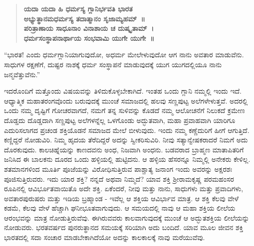 \begin{verse}
\textbf{ಯದಾ ಯದಾ ಹಿ ಧರ್ಮಸ್ಯ ಗ್ಲಾನಿರ್ಭವತಿ ಭಾರತ}\\\textbf{ಅಭ್ಯುತ್ಥಾನಮಧರ್ಮಸ್ಯ ತದಾತ್ಮಾನಂ ಸೃಜಾಮ್ಯಹಮ್​~॥}\\\textbf{ಪರಿತ್ರಾಣಾಯ ಸಾಧೂನಾಂ ವಿನಾಶಾಯ ಚ ದುಷ್ಕೃತಾಮ್​~।}\\\textbf{ಧರ್ಮಸಂಸ್ಥಾಪನಾರ್ಥಾಯ ಸಂಭವಾಮಿ ಯುಗೇ ಯುಗೇ~॥}
\end{verse}

“ಭಾರತ! ಎಂದು ಧರ್ಮಗ್ಲಾನಿಯಾಗುವುದೋ, ಅಧರ್ಮ ಮೇಲೇಳುವುದೋ ಆಗ ನಾನು ಅವತಾರ ಮಾಡುವೆನು. ಸಾಧುಗಳ ರಕ್ಷಣೆಗೆ, ದುಷ್ಟರ ನಾಶಕ್ಕೆ ಧರ್ಮ ಸಂಸ್ಥಾಪನೆ ಮಾಡುವುದಕ್ಕೆ ಯುಗ ಯುಗದಲ್ಲಿಯೂ ನಾನು ಜನ್ಮವೆತ್ತುವೆನು.”

ಇದರೊಂದಿಗೆ ಮತ್ತೊಂದು ವಿಷಯವನ್ನು ತಿಳಿದುಕೊಳ್ಳಬೇಕಾಗಿದೆ. ಇಂತಹ ಒಂದು ಗ್ಲಾನಿ ನಮ್ಮಲ್ಲಿ ಇಂದು ಇದೆ. ಆಧ್ಯಾತ್ಮಿಕ ಮಹಾತರಂಗವೊಂದು ಬರುವುದಕ್ಕೆ ಮುಂಚೆ ಸಮಾಜದಲ್ಲಿ ಹಲವು ಸಣ್ಣಪುಟ್ಟ ಅಲೆಗಳೇಳುತ್ತವೆ. ಅದರಲ್ಲಿ ಒಂದು ನಮ್ಮ ದೃಷ್ಟಿಗೆ ಗೋಚರವಾಗದೆ, ನಮಗೆ ತನ್ನ ಸುಳಿವನ್ನು ಕೊಡದೆ ನಮ್ಮ ಆಲೋಚನೆಗೆ ನಿಲುಕದೆ ಕ್ರಮೇಣ ದೊಡ್ಡದು ದೊಡ್ಡದಾಗಿ ಸಣ್ಣಪುಟ್ಟ ಅಲೆಗಳನ್ನೆಲ್ಲ ಒಳಗೊಂಡು ಅದ್ಭುತವಾಗಿ, ಮಹಾ ಪ್ರವಾಹವಾಗಿ ಯಾರಿಗೂ ಎದುರಿಸಲಾಗದ ಪ್ರಚಂಡ ಶಕ್ತಿಯೊಡನೆ ಸಮಾಜದ ಮೇಲೆ ಬೀಳುವುದು. ಇಂದು ನಮ್ಮ ಕಣ್ಣೆದುರಿಗೆ ಹೀಗೆ ಆಗುತ್ತಿದೆ. ಕಣ್ಣಿದ್ದರೆ ನೋಡುವಿರಿ. ನಿಮ್ಮ ಹೃದಯ ತೆರೆದಿದ್ದರೆ ಅದನ್ನು ಸ್ವೀಕರಿಸುವಿರಿ. ನೀವು ಸತ್ಯಾನ್ವೇಷಕರಾದರೆ ನಿಮಗೆ ಅದು ದೊರಕುವುದು. ಕಾಲಚಿಹ್ನೆಯನ್ನು ಕಾಣದವನು ಅಂಧ, ನಿಜವಾಗಿ ಅಂಧನು. ಬಡವರಾದ ಬ್ರಾಹ್ಮಣ ಮಾತಾಪಿತರಿಗೆ ಜನಿಸಿದ ಈ ಬಾಲಕನು ದೂರದ ಒಂದು ಹಳ್ಳಿಯಲ್ಲಿ ಹುಟ್ಟಿದನು. ಆ ಹಳ್ಳಿಯ ಹೆಸರನ್ನೂ ನಿಮ್ಮಲ್ಲಿ ಅನೇಕರು ಕೇಳಿಲ್ಲ. ಶತಮಾನಗಳಿಂದ ಮೂರ್ತಿ ಪೂಜೆಯನ್ನು ವಿರೋಧಿಸುತ್ತಿರುವ ಪಾಶ್ಚಾತ್ಯ ಜನಾಂಗ ಇಂದು ಅವರನ್ನು ಅಕ್ಷರಶಃ ಪೂಜಿಸುತ್ತಿರುವರು. ಇದು ಯಾರ ಶಕ್ತಿ? ನನ್ನದೆ ಅಥವಾ ನಿಮ್ಮದೆ? ಯಾವ ಶಕ್ತಿ ಶ‍್ರೀರಾಮಕೃಷ್ಣ ಪರಮಹಂಸರ ರೂಪಿನಲ್ಲಿ ಆವಿರ್ಭೂತವಾಯಿತೊ ಅದೇ ಶಕ್ತಿ. ಏಕೆಂದರೆ, ನೀವು ಮತ್ತು ನಾನು, ಸಾಧುಗಳು ಮತ್ತು ಪ್ರವಾದಿಗಳು, ಅವತಾರಪುರುಷರು ಮತ್ತು ಇಡಿಯ ಬ್ರಹ್ಮಾಂಡ - ಇವೆಲ್ಲ ಆ ಶಕ್ತಿಯ ಆವಿರ್ಭಾವ ಮಾತ್ರ. ಆ ಶಕ್ತಿ ಕೆಲವು ವೇಳೆ ಕಡಮೆ, ಕೆಲವು ವೇಳೆ ಹೆಚ್ಚಾಗಿ ಘನೀಭೂತವಾಗುವುದು. ಆ ಸಮಯದಲ್ಲಿ ನಾವು ಆ ಮಹಾ ಶಕ್ತಿಯ ಲೀಲೆಯ ಆರಂಭವನ್ನು ಮಾತ್ರ ನೋಡುತ್ತಿರುವೆವು. ಈಗಿರುವವರು ಕಾಲವಾಗುವುದಕ್ಕೆ ಮುಂಚೆ ಆ ಅದ್ಭುತಶಕ್ತಿಯ ಲೀಲೆಯನ್ನು ನೋಡುವರು. ಭರತವರ್ಷದ ಪುನರುತ್ಥಾನದ ಸಮಯಕ್ಕೆ ಸರಿಯಾಗಿ ಅದು ಬಂದಿದೆ. ಯಾವ ಮೂಲ ಜೀವನ ಶಕ್ತಿ ಭಾರತದಲ್ಲಿ ಸದಾ ಸಂಚಾರ ಮಾಡಬೇಕಾಗಿದೆಯೋ ಅದನ್ನು ಕಾಲಕಾಲಕ್ಕೆ ನಾವು ಮರೆಯುವೆವು.

